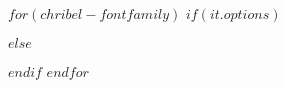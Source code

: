 
\usepackage{amssymb, amsmath}

\usepackage[utf8]{inputenc} 

\usepackage{lastpage} 

\usepackage{multicol}
\setlength\columnsep{20pt}

\usepackage[dvipsnames]{xcolor}

\usepackage{fontawesome5}

\usepackage[nodisplayskipstretch]{setspace}


$for(chribel-fontfamily)$
$if(it.options)$
\usepackage[$it.options$]{$it.name$}
$else$
\usepackage{$it.name$}
$endif$
$endfor$


\usepackage{tikz}
\usetikzlibrary{shapes,arrows,arrows.meta,matrix,decorations.pathmorphing}
\newcommand*\circled[1]{\tikz[baseline=(char.base)]{
            \node[shape=circle,draw,inner sep=2pt] (char) {#1};}}           


\usepackage{sectsty}
\allsectionsfont{\normalfont\bfseries\sffamily}

